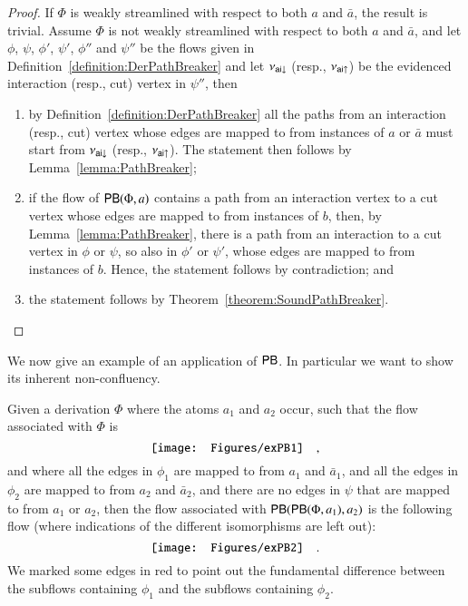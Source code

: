 
\begin{proof}
If $\Phi$ is weakly streamlined with respect to both $a$ and $\bar a$, the result is trivial. Assume $\Phi$ is not weakly streamlined with respect to both $a$ and $\bar a$, and let $\phi$, $\psi$, $\phi'$, $\psi'$, $\phi''$ and $\psi''$ be the flows given in Definition~\vref{definition:DerPathBreaker} and let $\nu_{{\mathsf{ai}}{\downarrow}}$ (resp., $\nu_{{\mathsf{ai}}{\uparrow}}$) be the evidenced interaction (resp., cut) vertex in $\psi''$, then
\begin{enumerate}
\item by Definition~\ref{definition:DerPathBreaker} all the paths from an interaction (resp., cut) vertex whose edges are mapped to from instances of $a$ or $\bar a$ must start from $\nu_{{\mathsf{ai}}{\downarrow}}$ (resp., $\nu_{{\mathsf{ai}}{\uparrow}}$). The statement then follows by Lemma~\vref{lemma:PathBreaker};
\item if the flow of $\mathsf{PB}(\Phi,a)$ contains a path from an interaction vertex to a cut vertex  whose edges are mapped to from instances of $b$, then, by Lemma~\ref{lemma:PathBreaker}, there is a path from an interaction to a cut vertex in $\phi$ or $\psi$, so also in $\phi'$ or $\psi'$, whose edges are mapped to from instances of $b$. Hence, the statement follows by contradiction; and
\item the statement follows by Theorem~\vref{theorem:SoundPathBreaker}.
\end{enumerate}
\end{proof}


We now give an example of an application of $\mathsf{PB}$. In particular we want to show its inherent non-confluency.

\begin{example}\label{example:PathBreaker}
Given a derivation $\Phi$ where the atoms $a_1$ and $a_2$ occur, such that the flow associated with $\Phi$ is
\[
\vcenter{\hbox{\texttt{[image: Figures/exPB1]}}}
\quad,
\]
and where all the edges in $\phi_1$ are mapped to from $a_1$ and $\bar a_1$, and all the edges in $\phi_2$ are mapped to from $a_2$ and $\bar a_2$, and there are no edges in $\psi$ that are mapped to from $a_1$ or $a_2$, then the flow associated with $\mathsf{PB}(\mathsf{PB}(\Phi,a_1),a_2)$ is the following flow (where indications of the different isomorphisms are left out):
\[\hss
\vcenter{\hbox{\texttt{[image: Figures/exPB2]}}}
\quad.
\]
We marked some edges in red to point out the fundamental difference between the subflows containing $\phi_1$ and the subflows containing $\phi_2$.
\end{example}
